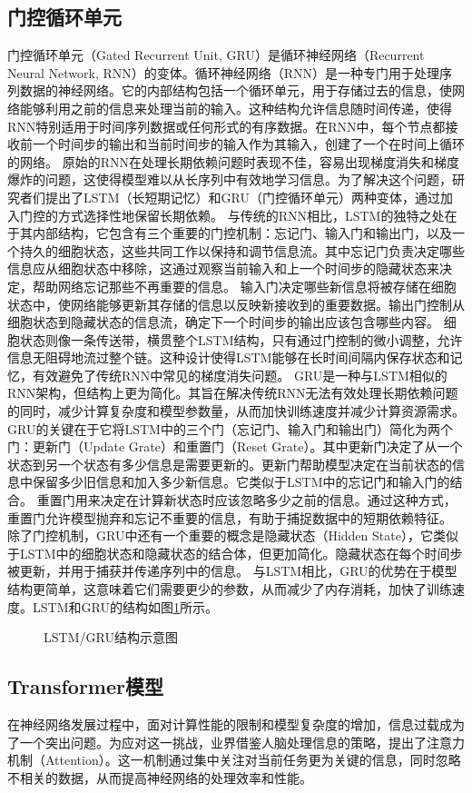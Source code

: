 \subsection{门控循环单元}
门控循环单元（Gated Recurrent Unit, GRU）是循环神经网络（Recurrent Neural
Network, RNN）的变体。循环神经网络（RNN）是一种专门用于处理序列数据的神经网络。它的内部结构包括一个循环单元，用于存储过去的信息，使网络能够利用之前的信息来处理当前的输入。这种结构允许信息随时间传递，使得RNN特别适用于时间序列数据或任何形式的有序数据。在RNN中，每个节点都接收前一个时间步的输出和当前时间步的输入作为其输入，创建了一个在时间上循环的网络。
原始的RNN在处理长期依赖问题时表现不佳，容易出现梯度消失和梯度爆炸的问题，这使得模型难以从长序列中有效地学习信息。为了解决这个问题，研究者们提出了LSTM（长短期记忆）和GRU（门控循环单元）两种变体，通过加入门控的方式选择性地保留长期依赖。
与传统的RNN相比，LSTM的独特之处在于其内部结构，它包含有三个重要的门控机制：忘记门、输入门和输出门，以及一个持久的细胞状态，这些共同工作以保持和调节信息流。其中忘记门负责决定哪些信息应从细胞状态中移除，这通过观察当前输入和上一个时间步的隐藏状态来决定，帮助网络忘记那些不再重要的信息。
输入门决定哪些新信息将被存储在细胞状态中，使网络能够更新其存储的信息以反映新接收到的重要数据。输出门控制从细胞状态到隐藏状态的信息流，确定下一个时间步的输出应该包含哪些内容。
细胞状态则像一条传送带，横贯整个LSTM结构，只有通过门控制的微小调整，允许信息无阻碍地流过整个链。这种设计使得LSTM能够在长时间间隔内保存状态和记忆，有效避免了传统RNN中常见的梯度消失问题。
GRU是一种与LSTM相似的RNN架构，但结构上更为简化。其旨在解决传统RNN无法有效处理长期依赖问题的同时，减少计算复杂度和模型参数量，从而加快训练速度并减少计算资源需求。
GRU的关键在于它将LSTM中的三个门（忘记门、输入门和输出门）简化为两个门：更新门（Update Grate）和重置门（Reset Grate）。其中更新门决定了从一个状态到另一个状态有多少信息是需要更新的。更新门帮助模型决定在当前状态的信息中保留多少旧信息和加入多少新信息。它类似于LSTM中的忘记门和输入门的结合。
重置门用来决定在计算新状态时应该忽略多少之前的信息。通过这种方式，重置门允许模型抛弃和忘记不重要的信息，有助于捕捉数据中的短期依赖特征。
除了门控机制，GRU中还有一个重要的概念是隐藏状态（Hidden State），它类似于LSTM中的细胞状态和隐藏状态的结合体，但更加简化。隐藏状态在每个时间步被更新，并用于捕获并传递序列中的信息。
与LSTM相比，GRU的优势在于模型结构更简单，这意味着它们需要更少的参数，从而减少了内存消耗，加快了训练速度。LSTM和GRU的结构如图\ref{fig:lstmandgru}所示。
\begin{figure}[H]
    \centering
    \caption{LSTM/GRU结构示意图}
    \label{fig:lstmandgru}
\end{figure}
\subsection{Transformer模型}
在神经网络发展过程中，面对计算性能的限制和模型复杂度的增加，信息过载成为了一个突出问题。为应对这一挑战，业界借鉴人脑处理信息的策略，提出了注意力机制（Attention）。这一机制通过集中关注对当前任务更为关键的信息，同时忽略不相关的数据，从而提高神经网络的处理效率和性能。

